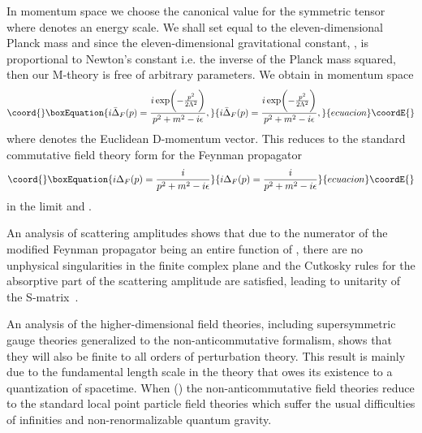 \documentclass[a4paper,12pt]{article}
\begin{document}
In momentum space we choose
the canonical value for the symmetric tensor
\coordHE{} where \myHighlight{$\Lambda$}\coordHE{}
denotes an energy scale. We shall set \myHighlight{$\Lambda$}\coordHE{} equal to the
eleven-dimensional Planck mass \coordHE{} and since the
eleven-dimensional gravitational constant, \coordHE{}, is
proportional to Newton's constant i.e. the inverse of the Planck
mass squared, then our M-theory is free of arbitrary parameters.
We obtain in momentum space
\begin{equation}\coord{}\boxEquation{
i{\bar\Delta}_F(p)=\frac{i\exp\biggl(-\frac{p^2}{2\Lambda^2}\biggr)}
{p^2+m^2-i\epsilon},
}{
i{\bar\Delta}_F(p)=\frac{i\exp\biggl(-\frac{p^2}{2\Lambda^2}\biggr)}
{p^2+m^2-i\epsilon},
}{ecuacion}\coordE{}\end{equation}
where \coordHE{} denotes the Euclidean D-momentum vector. This
reduces to the standard commutative field theory form for the
Feynman propagator
\begin{equation}\coord{}\boxEquation{
i\Delta_F(p)=\frac{i}{p^2+m^2-i\epsilon}
}{
i\Delta_F(p)=\frac{i}{p^2+m^2-i\epsilon}
}{ecuacion}\coordE{}\end{equation} in
the limit \coordHE{} and
\myHighlight{$\Lambda\rightarrow\infty$}\coordHE{}.

An analysis of scattering amplitudes shows that due to
the numerator of the modified Feynman propagator being an entire function
of \coordHE{}, there are no unphysical singularities in the finite complex \coordHE{}
plane and the Cutkosky rules for the absorptive part of the scattering
amplitude are satisfied, leading to unitarity of the
S-matrix~\cite{Moffat4}.

An analysis of the higher-dimensional field theories,
including supersymmetric gauge theories generalized to the
non-anticommutative formalism, shows that they will also be finite to all
orders of perturbation theory. This result is mainly due to the
fundamental length scale \myHighlight{$\ell$}\coordHE{} in the theory that owes its existence
to a quantization of spacetime. When \coordHE{}
(\myHighlight{$\Lambda\rightarrow\infty$}\coordHE{}) the non-anticommutative field theories reduce
to the standard local point particle field theories which suffer the usual
difficulties of infinities and non-renormalizable quantum gravity.
\end{document}
